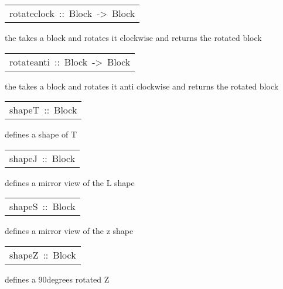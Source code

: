 \begin{haddockdesc}
\item[\begin{tabular}{@{}l}
rotateclock\ ::\ Block\ ->\ Block
\end{tabular}]\haddockbegindoc
the  takes a block and rotates it clockwise and returns the rotated block \par

\end{haddockdesc}
\begin{haddockdesc}
\item[\begin{tabular}{@{}l}
rotateanti\ ::\ Block\ ->\ Block
\end{tabular}]\haddockbegindoc
the  takes a block and rotates it anti clockwise and returns the rotated block \par

\end{haddockdesc}
\begin{haddockdesc}
\item[\begin{tabular}{@{}l}
shapeT\ ::\ Block
\end{tabular}]\haddockbegindoc
{} defines a shape of T \par

\end{haddockdesc}
\begin{haddockdesc}
\item[\begin{tabular}{@{}l}
shapeJ\ ::\ Block
\end{tabular}]\haddockbegindoc
{} defines a mirror view of the L shape\par

\end{haddockdesc}
\begin{haddockdesc}
\item[\begin{tabular}{@{}l}
shapeS\ ::\ Block
\end{tabular}]\haddockbegindoc
{} defines a mirror view of the z shape\par

\end{haddockdesc}
\begin{haddockdesc}
\item[\begin{tabular}{@{}l}
shapeZ\ ::\ Block
\end{tabular}]\haddockbegindoc
{} defines a 90degrees rotated Z\par

\end{haddockdesc}
